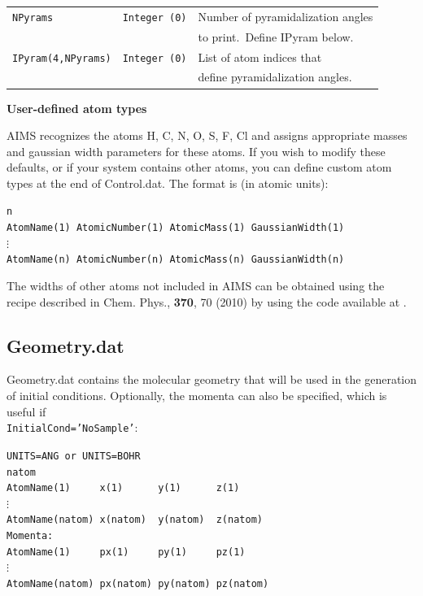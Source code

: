 \documentclass[11pt]{article}
\begin{document}
\begin{table}[h]
\begin{tabular}{ l l l }
{\tt NPyrams}                & {\tt Integer (0)}      & {\small Number of pyramidalization angles}\\&&
                                                        {\small to print.\footnotemark \ Define IPyram below.}\\
{\tt IPyram(4,NPyrams)}      & {\tt Integer (0)}      & {\small List of atom indices that}\\&&
                                                        {\small define pyramidalization angles.}\\
\hline\hline
\end{tabular}
\end{table}



\clearpage
\newpage
{}
{\bf User-defined atom types}

AIMS recognizes the atoms H, C, N, O, S, F, Cl and assigns appropriate masses and gaussian width
parameters for these atoms. If you wish to modify these defaults, or if your system contains other
atoms, you can define custom atom types at the end of Control.dat. The format is
 (in atomic units):

{\tt n}\\
{\tt AtomName(1) AtomicNumber(1) AtomicMass(1) GaussianWidth(1)}\\
$\vdots$\\
{\tt AtomName(n) AtomicNumber(n) AtomicMass(n) GaussianWidth(n)}

The widths of other atoms not included in AIMS can be obtained using the recipe described in Chem. Phys., \textbf{370}, 70 (2010) by using the code available at \url{}.

\subsection{Geometry.dat\label{geomdat}}
Geometry.dat contains the molecular geometry that will be used in the generation of initial conditions.
Optionally, the momenta can also be specified, which is useful if\\
{\tt InitialCond='NoSample'}:

{\tt UNITS=ANG or UNITS=BOHR }\\
{\tt natom}\\
{\tt AtomName(1)\ \ \ \ \ x(1)\ \ \ \ \ \ y(1)\ \ \ \ \ \ z(1)}\\
$\vdots$\\
{\tt AtomName(natom) x(natom)\ \ y(natom)\ \ z(natom)}\\
{\tt Momenta:}\\
{\tt AtomName(1)\ \ \ \ \ px(1)\ \ \ \ \ py(1)\ \ \ \ \ pz(1)}\\  
$\vdots$\\                                      
{\tt AtomName(natom) px(natom) py(natom) pz(natom)}
\end{document}
